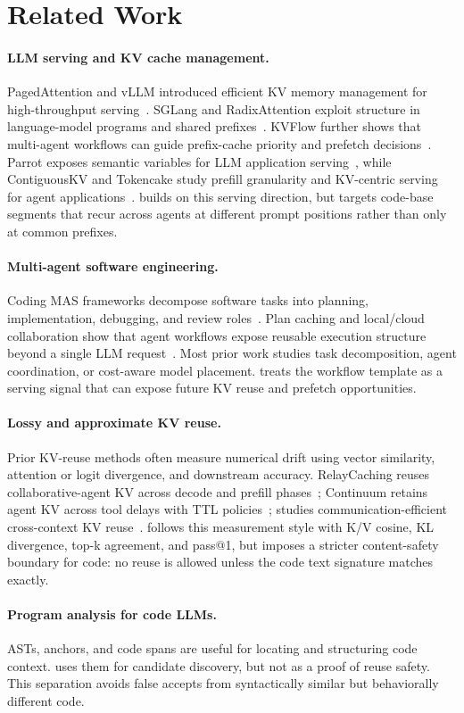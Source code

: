 \section{Related Work}

\paragraph{LLM serving and KV cache management.}
PagedAttention and vLLM introduced efficient KV memory management for high-throughput serving~\cite{kwon2023vllm}.
SGLang and RadixAttention exploit structure in language-model programs and shared prefixes~\cite{zheng2023sglang}.
KVFlow further shows that multi-agent workflows can guide prefix-cache priority and prefetch decisions~\cite{kvflow2025}.
Parrot exposes semantic variables for LLM application serving~\cite{parrot2024}, while ContiguousKV and Tokencake study prefill granularity and KV-centric serving for agent applications~\cite{contiguouskv,tokencake2025}.
\system builds on this serving direction, but targets code-base segments that recur across agents at different prompt positions rather than only at common prefixes.

\paragraph{Multi-agent software engineering.}
Coding MAS frameworks decompose software tasks into planning, implementation, debugging, and review roles~\cite{multiagent2025,llmagents2024}.
Plan caching and local/cloud collaboration show that agent workflows expose reusable execution structure beyond a single LLM request~\cite{plancaching2026,minions2025}.
Most prior work studies task decomposition, agent coordination, or cost-aware model placement.
\system treats the workflow template as a serving signal that can expose future KV reuse and prefetch opportunities.

\paragraph{Lossy and approximate KV reuse.}
Prior KV-reuse methods often measure numerical drift using vector similarity, attention or logit divergence, and downstream accuracy.
RelayCaching reuses collaborative-agent KV across decode and prefill phases~\cite{relaycaching}; Continuum retains agent KV across tool delays with TTL policies~\cite{continuum}; \kvcomm studies communication-efficient cross-context KV reuse~\cite{kvcomm2025}.
\system follows this measurement style with K/V cosine, KL divergence, top-k agreement, and pass@1, but imposes a stricter content-safety boundary for code: no reuse is allowed unless the code text signature matches exactly.

\paragraph{Program analysis for code LLMs.}
ASTs, anchors, and code spans are useful for locating and structuring code context.
\system uses them for candidate discovery, but not as a proof of reuse safety.
This separation avoids false accepts from syntactically similar but behaviorally different code.
